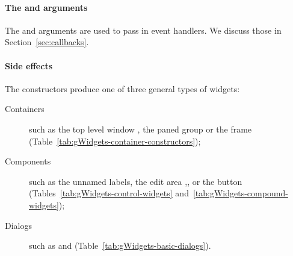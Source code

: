 \paragraph{The  and  arguments}
The  and  arguments are used to pass in
event handlers. We discuss those in Section~\ref{sec:callbacks}.


\paragraph{Side effects}
The constructors produce one of three general types of widgets:
\begin{description}
\item[Containers] such as the top level window , the paned
  group  or the frame 
 (Table~\ref{tab:gWidgets-container-constructors});
%
\item[Components] such as the unnamed labels, the edit area
  ,, or the button 
  (Tables~\ref{tab:gWidgets-control-widgets}
  and~\ref{tab:gWidgets-compound-widgets});
%
\item[Dialogs] such as  and  (Table~\ref{tab:gWidgets-basic-dialogs}).
\end{description}








